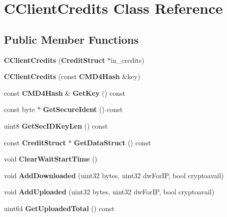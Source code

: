 \section{CClientCredits Class Reference}
\label{classCClientCredits}
\subsection*{Public Member Functions}
\begin{DoxyCompactItemize}
\item 
{\bfseries CClientCredits} ({\bf CreditStruct} $\ast$in\_\-credits)\label{classCClientCredits_ae08b8e873e85effea0cb6fefefa41501}

\item 
{\bfseries CClientCredits} (const {\bf CMD4Hash} \&key)\label{classCClientCredits_a4dff2237362aaa8bfbc4e61cbfcc5105}

\item 
const {\bf CMD4Hash} \& {\bfseries GetKey} () const \label{classCClientCredits_a73b7c372159f7e58396419f5b466430b}

\item 
const byte $\ast$ {\bfseries GetSecureIdent} () const \label{classCClientCredits_a43e366a7c34536ce3a2afc1d3e58b9d9}

\item 
uint8 {\bfseries GetSecIDKeyLen} () const \label{classCClientCredits_a399ba61579396b6fe634b2e51dfc28c1}

\item 
const {\bf CreditStruct} $\ast$ {\bfseries GetDataStruct} () const \label{classCClientCredits_a2caff0d2ba2bbba9486bae1e02c33e28}

\item 
void {\bfseries ClearWaitStartTime} ()\label{classCClientCredits_aa047416fa3636925e175f5f4a4c28654}

\item 
void {\bfseries AddDownloaded} (uint32 bytes, uint32 dwForIP, bool cryptoavail)\label{classCClientCredits_a2bd2ef2205597c798773c85b12b3b668}

\item 
void {\bfseries AddUploaded} (uint32 bytes, uint32 dwForIP, bool cryptoavail)\label{classCClientCredits_ac45d460b2e1b3cc2740e96d69c0ff0c1}

\item 
uint64 {\bfseries GetUploadedTotal} () const \label{classCClientCredits_a9b70c8727950e89a5810ce2e2d48da24}


\end{DoxyCompactItemize}
